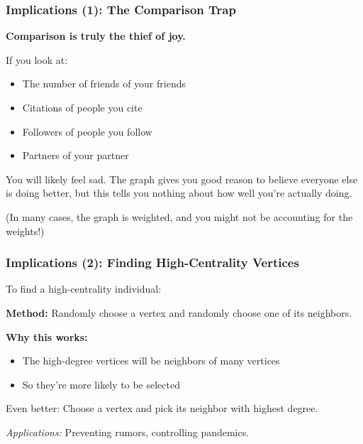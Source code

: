 \documentclass{beamer}
\begin{document}
\begin{frame}
  \frametitle{Implications (1): The Comparison Trap}
  
  \textbf{Comparison is truly the thief of joy.}
  
  If you look at:
  \begin{itemize}
    \item The number of friends of your friends
    \item Citations of people you cite
    \item Followers of people you follow
    \item Partners of your partner
  \end{itemize}
  
  You will likely feel sad. The graph gives you good reason to believe everyone else is doing better, but this tells you nothing about how well you're actually doing.
  
  (In many cases, the graph is weighted, and you might not be accounting for the weights!)
\end{frame}

\begin{frame}
  \frametitle{Implications (2): Finding High-Centrality Vertices}
  
  To find a high-centrality individual:
  
  \textbf{Method:} Randomly choose a vertex and randomly choose one of its neighbors.
  
  \vspace{0.3cm}
  
  \textbf{Why this works:}
  \begin{itemize}
    \item The high-degree vertices will be neighbors of many vertices
    \item So they're more likely to be selected
  \end{itemize}
  
  \vspace{0.3cm}
  
  Even better: Choose a vertex and pick its neighbor with highest degree.
  
  \textit{Applications:} Preventing rumors, controlling pandemics.
\end{frame}
\end{document}
